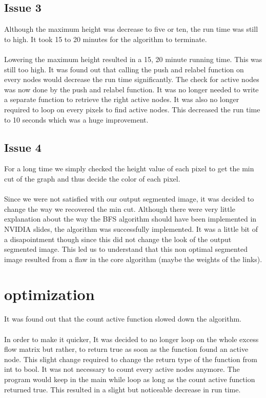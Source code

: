 \documentclass{article}
\begin{document}
\subsection{Issue 3}

Although the maximum height was decrease to five or ten, the run time was still to high. It took 15 to 20 minutes for the algorithm to terminate.\\
\\
Lowering the maximum height resulted in a 15, 20 minute running time. This was still too high. It was found out that calling the push and relabel function on every nodes would decrease the run time significantly. The check for active nodes was now done by the push and relabel function. It was no longer needed to write a separate function to retrieve the right active nodes. It was also no longer required to loop on every pixels to find active nodes. This decreased the run time to 10 seconds which was a huge improvement.

\subsection{Issue 4}

For a long time we simply checked the height value of each pixel to get the min cut of the graph and thus decide the color of each pixel.\\
\\
Since we were not satisfied with our output segmented image, it was decided to change the way we recovered the min cut. Although there were very little explanation about the way the BFS algorithm should have been implemented in NVIDIA slides, the algorithm was successfully implemented. It was a little bit of a disapointment though since this did not change the look of the output segmented image. This led us to understand that this non optimal segmented image resulted from a flaw in the core algorithm (maybe the weights of the links).

\section{optimization}

It was found out that the count active function slowed down the algorithm. \\
\\
In order to make it quicker, It was decided to no longer loop on the whole excess flow matrix but rather, to return true as soon as the function found an active node. This slight change required to change the return type of the function from int to bool. It was not necessary to count every active nodes anymore. The program would keep in the main while loop as long as the count active function returned true. This resulted in a slight but noticeable decrease in run time.
\end{document}
